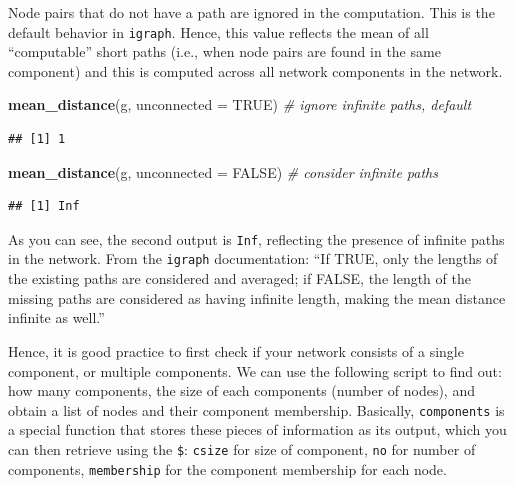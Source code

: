 \documentclass[
]{book}
\newenvironment{Shaded}{\begin{snugshade}}{\end{snugshade}}
\newcommand{\AttributeTok}[1]{\textcolor[rgb]{0.13,0.29,0.53}{#1}}
\newcommand{\CommentTok}[1]{\textcolor[rgb]{0.56,0.35,0.01}{\textit{#1}}}
\newcommand{\ConstantTok}[1]{\textcolor[rgb]{0.56,0.35,0.01}{#1}}
\newcommand{\FunctionTok}[1]{\textcolor[rgb]{0.13,0.29,0.53}{\textbf{#1}}}
\newcommand{\NormalTok}[1]{#1}
\newcommand{\OtherTok}[1]{\textcolor[rgb]{0.56,0.35,0.01}{#1}}
\newcommand{\SpecialCharTok}[1]{\textcolor[rgb]{0.81,0.36,0.00}{\textbf{#1}}}
\begin{document}
Node pairs that do not have a path are ignored in the computation. This is the default behavior in \texttt{igraph}. Hence, this value reflects the mean of all ``computable'' short paths (i.e., when node pairs are found in the same component) and this is computed across all network components in the network.

\begin{Shaded}
\begin{Highlighting}[]
\FunctionTok{mean\_distance}\NormalTok{(g, }\AttributeTok{unconnected =} \ConstantTok{TRUE}\NormalTok{) }\CommentTok{\# ignore infinite paths, default }
\end{Highlighting}
\end{Shaded}

\begin{verbatim}
## [1] 1
\end{verbatim}

\begin{Shaded}
\begin{Highlighting}[]
\FunctionTok{mean\_distance}\NormalTok{(g, }\AttributeTok{unconnected =} \ConstantTok{FALSE}\NormalTok{) }\CommentTok{\# consider infinite paths }
\end{Highlighting}
\end{Shaded}

\begin{verbatim}
## [1] Inf
\end{verbatim}

As you can see, the second output is \texttt{Inf}, reflecting the presence of infinite paths in the network. From the \texttt{igraph} documentation: ``If TRUE, only the lengths of the existing paths are considered and averaged; if FALSE, the length of the missing paths are considered as having infinite length, making the mean distance infinite as well.''

Hence, it is good practice to first check if your network consists of a single component, or multiple components. We can use the following script to find out: how many components, the size of each components (number of nodes), and obtain a list of nodes and their component membership. Basically, \texttt{components} is a special function that stores these pieces of information as its output, which you can then retrieve using the \texttt{\$}: \texttt{csize} for size of component, \texttt{no} for number of components, \texttt{membership} for the component membership for each node.

\begin{Shaded}
\end{Shaded}
\end{document}
